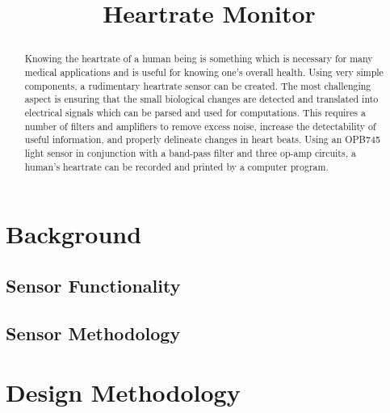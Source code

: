 \documentclass[conference]{IEEEtran}
\begin{document}
\title{Heartrate Monitor\\

\author{
\and
{}
}
}

\maketitle

\begin{abstract}
Knowing the heartrate of a human being is something which is necessary for many medical applications and is useful for knowing one's overall health. Using very simple components, a rudimentary heartrate sensor can be created. The most challenging aspect is ensuring that the small biological changes are detected and translated into electrical signals which can be parsed and used for computations. This requires a number of filters and amplifiers to remove excess noise, increase the detectability of useful information, and properly delineate changes in heart beats. Using an OPB745 light sensor in conjunction with a band-pass filter and three op-amp circuits, a human's heartrate can be recorded and printed by a computer program.
\end{abstract}

\section{Background}
    \subsection{Sensor Functionality}
    \subsection{Sensor Methodology}

\section{Design Methodology}
\end{document}
